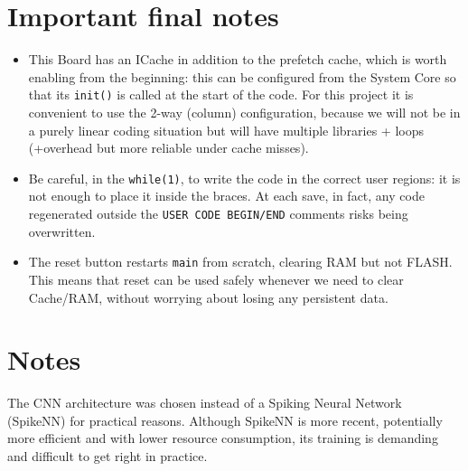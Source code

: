 \section*{Important final notes}

\begin{itemize}
    \item This Board has an ICache in addition to the prefetch cache, which is worth enabling from the beginning: this can be configured from the System Core so that its \texttt{init()} is called at the start of the code. For this project it is convenient to use the 2-way (column) configuration, because we will not be in a purely linear coding situation but will have multiple libraries + loops (+overhead but more reliable under cache misses).
    \item Be careful, in the \texttt{while(1)}, to write the code in the correct user regions: it is not enough to place it inside the braces. At each save, in fact, any code regenerated outside the \texttt{USER CODE BEGIN/END} comments risks being overwritten.
    \item The reset button restarts \texttt{main} from scratch, clearing RAM but not FLASH. This means that reset can be used safely whenever we need to clear Cache/RAM, without worrying about losing any persistent data.
\end{itemize}

\section*{Notes}

The CNN architecture was chosen instead of a Spiking Neural Network (SpikeNN) for practical reasons. Although SpikeNN is more recent, potentially more efficient and with lower resource consumption, its training is demanding and difficult to get right in practice.


